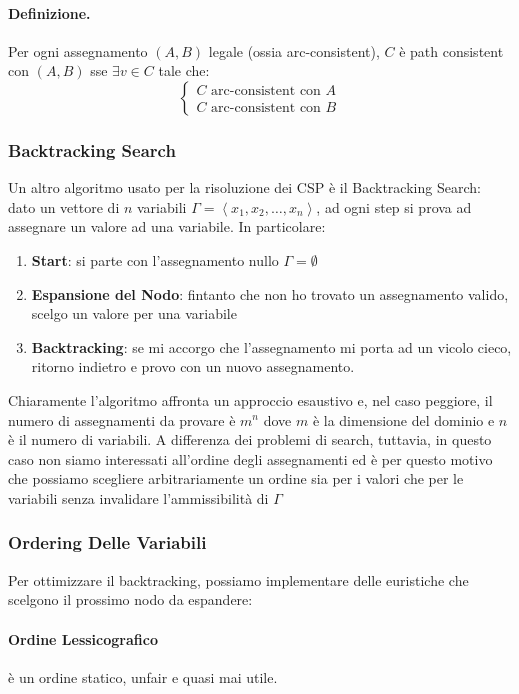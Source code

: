 \paragraph{Definizione.}Per ogni assegnamento $(A,B)$ legale (ossia arc-consistent), $C$ è  path consistent con $(A,B)$ sse
$\exists v \in C$ tale che:
\begin{equation}
    \begin{cases}
        C \text{ arc-consistent con } A\\
        C \text{ arc-consistent con } B 
    \end{cases}
\end{equation}

\subsubsection{Backtracking Search}
Un altro algoritmo usato per la risoluzione dei CSP è il Backtracking Search: dato un vettore di $n$ variabili
$\Gamma = \left\langle x_1, x_2, \dots, x_n\right\rangle $, ad ogni step si prova ad assegnare un valore ad una variabile.
In particolare:
\begin{enumerate}
    \item \textbf{Start}: si parte con l'assegnamento nullo $\Gamma = \emptyset$
    \item \textbf{Espansione del Nodo}: fintanto che non ho trovato un assegnamento valido, scelgo un valore per una variabile
    \item \textbf{Backtracking}: se mi accorgo che l'assegnamento mi porta ad un vicolo cieco, ritorno indietro e provo con un nuovo assegnamento.
\end{enumerate}
Chiaramente l'algoritmo affronta un approccio esaustivo e, nel caso peggiore, il numero di assegnamenti da provare è $m^n$ dove
$m$ è la dimensione del dominio e $n$ è il numero di variabili. A differenza dei problemi di search, tuttavia, in questo caso
non siamo interessati all'ordine degli assegnamenti ed è per questo motivo che possiamo scegliere arbitrariamente un ordine sia per i valori
che per le variabili senza invalidare l'ammissibilità di $\Gamma$ 
\subsubsection{Ordering Delle Variabili}
Per ottimizzare il backtracking, possiamo implementare delle euristiche che scelgono il prossimo nodo da espandere:
\paragraph{Ordine Lessicografico}è un ordine statico, unfair e quasi mai utile.
